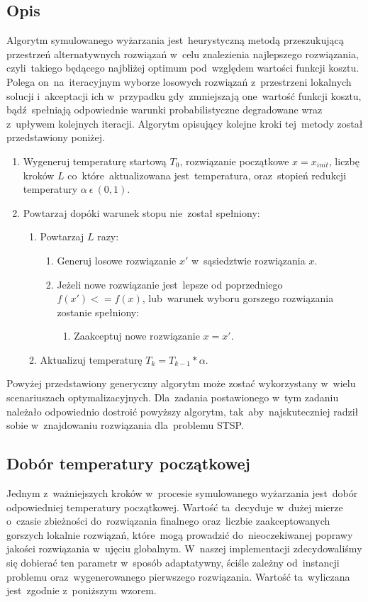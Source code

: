 \subsection{Opis}

Algorytm symulowanego wyżarzania jest~heurystyczną metodą przeszukującą przestrzeń alternatywnych rozwiązań w~celu znalezienia najlepszego rozwiązania, czyli~takiego będącego najbliżej optimum pod~względem wartości funkcji kosztu. Polega on~na~iteracyjnym wyborze losowych rozwiązań z~przestrzeni lokalnych solucji i~akceptacji ich w~przypadku gdy~zmniejszają one~wartość funkcji kosztu, bądź~spełniają odpowiednie warunki probabilistyczne degradowane wraz z~upływem kolejnych iteracji. Algorytm opisujący kolejne kroki tej~metody został przedstawiony poniżej.

\begin{enumerate}
	\item Wygeneruj temperaturę startową $T_0$, rozwiązanie początkowe $x = x_{init}$, liczbę kroków $L$ co~które~aktualizowana jest~temperatura, oraz~stopień redukcji temperatury $\alpha~\epsilon~(0, 1)$.
	\item Powtarzaj dopóki warunek stopu nie~został spełniony:
	\begin{enumerate}
		\item Powtarzaj $L$ razy:
		\begin{enumerate}
			\item Generuj losowe rozwiązanie $x'$ w~sąsiedztwie rozwiązania $x$.
			\item Jeżeli nowe rozwiązanie jest~lepsze od poprzedniego $f(x') <= f(x)$, lub~warunek wyboru gorszego rozwiązania zostanie spełniony:
			\begin{enumerate}
				\item Zaakceptuj nowe rozwiązanie $x = x'$.
			\end{enumerate}
		\end{enumerate}
		\item Aktualizuj temperaturę $T_k = T_{k-1} * \alpha$.
	\end{enumerate}
\end{enumerate}

Powyżej przedstawiony generyczny algorytm może zostać wykorzystany w~wielu scenariuszach optymalizacyjnych. Dla~zadania postawionego w~tym zadaniu należało odpowiednio dostroić powyższy algorytm, tak~aby~najskuteczniej radził sobie w~znajdowaniu rozwiązania dla~problemu STSP.


\subsection{Dobór temperatury początkowej}
Jednym z~ważniejszych kroków w~procesie symulowanego wyżarzania jest~dobór odpowiedniej temperatury początkowej. Wartość ta~decyduje w~dużej mierze o~czasie zbieżności do~rozwiązania finalnego oraz~liczbie zaakceptowanych gorszych lokalnie rozwiązań, które~mogą prowadzić do~nieoczekiwanej poprawy jakości rozwiązania w~ujęciu globalnym. W~naszej implementacji zdecydowaliśmy się dobierać ten parametr w~sposób adaptatywny, ściśle zależny od~instancji problemu oraz~wygenerowanego pierwszego rozwiązania. Wartość ta~wyliczana jest~zgodnie z~poniższym wzorem.


